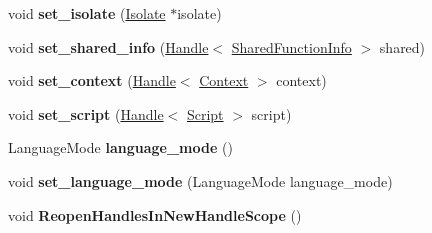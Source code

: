 \begin{DoxyCompactItemize}
\item 
void {\bfseries set\+\_\+isolate} (\hyperlink{classv8_1_1internal_1_1_isolate}{Isolate} $\ast$isolate)\hypertarget{classv8_1_1internal_1_1_parse_info_a62580961e18d75cf24dfd53051a26aaa}{}\label{classv8_1_1internal_1_1_parse_info_a62580961e18d75cf24dfd53051a26aaa}

\item 
void {\bfseries set\+\_\+shared\+\_\+info} (\hyperlink{classv8_1_1internal_1_1_handle}{Handle}$<$ \hyperlink{classv8_1_1internal_1_1_shared_function_info}{Shared\+Function\+Info} $>$ shared)\hypertarget{classv8_1_1internal_1_1_parse_info_ae69a22bf7c2de74c41788c00f7d8dd29}{}\label{classv8_1_1internal_1_1_parse_info_ae69a22bf7c2de74c41788c00f7d8dd29}

\item 
void {\bfseries set\+\_\+context} (\hyperlink{classv8_1_1internal_1_1_handle}{Handle}$<$ \hyperlink{classv8_1_1internal_1_1_context}{Context} $>$ context)\hypertarget{classv8_1_1internal_1_1_parse_info_a42d27717f6b9301c5f44c73ed138fb65}{}\label{classv8_1_1internal_1_1_parse_info_a42d27717f6b9301c5f44c73ed138fb65}

\item 
void {\bfseries set\+\_\+script} (\hyperlink{classv8_1_1internal_1_1_handle}{Handle}$<$ \hyperlink{classv8_1_1internal_1_1_script}{Script} $>$ script)\hypertarget{classv8_1_1internal_1_1_parse_info_a8275f3c8288ce7fcb7d24329a2de2b59}{}\label{classv8_1_1internal_1_1_parse_info_a8275f3c8288ce7fcb7d24329a2de2b59}

\item 
Language\+Mode {\bfseries language\+\_\+mode} ()\hypertarget{classv8_1_1internal_1_1_parse_info_aa9c280160046cab0671eb904373b61c6}{}\label{classv8_1_1internal_1_1_parse_info_aa9c280160046cab0671eb904373b61c6}

\item 
void {\bfseries set\+\_\+language\+\_\+mode} (Language\+Mode language\+\_\+mode)\hypertarget{classv8_1_1internal_1_1_parse_info_aa05e14567a819f90061a984f7abd163c}{}\label{classv8_1_1internal_1_1_parse_info_aa05e14567a819f90061a984f7abd163c}

\item 
void {\bfseries Reopen\+Handles\+In\+New\+Handle\+Scope} ()\hypertarget{classv8_1_1internal_1_1_parse_info_a779a662f34f5e10f0537ed4d8c93dd6a}{}\label{classv8_1_1internal_1_1_parse_info_a779a662f34f5e10f0537ed4d8c93dd6a}

\end{DoxyCompactItemize}
